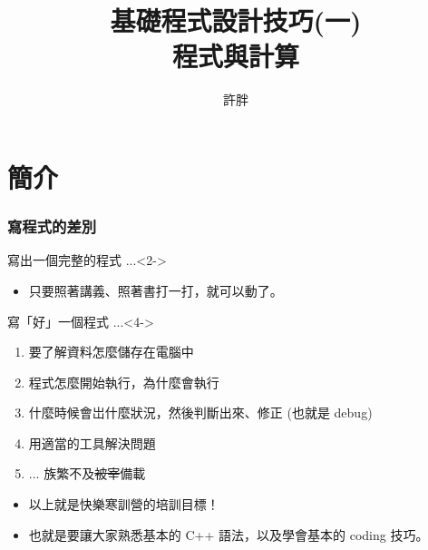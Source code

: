 \documentclass[utf8]{beamer}
\begin{document}
\begin{CJK}{UTF8}{bkai}

\title{基礎程式設計技巧(一)\\程式與計算}
\author{許胖}

\begin{frame}
  \titlepage
\end{frame}

\section{簡介}

\begin{frame}
  \frametitle{寫程式的差別}
  \begin{block}{寫出一個完整的程式 ...}<2->
    \begin{itemize}[<3->]
    \item 只要照著講義、照著書打一打，就可以動了。
    \end{itemize}
  \end{block}
  \begin{exampleblock}{寫「好」一個程式 ...}<4->
    \begin{enumerate}
    \item<5-> 要了解資料怎麼儲存在電腦中
    \item<6-> 程式怎麼開始執行，為什麼會執行
    \item<7-> 什麼時候會岀什麼狀況，然後判斷出來、修正 (也就是 debug)
    \item<8-> 用適當的工具解決問題
    \item<9-> ... 族繁不及\sout{被宰}備載
    \end{enumerate}
  \end{exampleblock}
  \begin{itemize}
  \item<10-> 以上就是快樂寒訓營的\alert{培訓目標}！
  \item<11-> 也就是要讓大家熟悉\alert{基本的 C++ 語法}，以及學會基本的 \alert{coding 技巧}。
  \end{itemize}
\end{frame}


\end{CJK}
\end{document}
